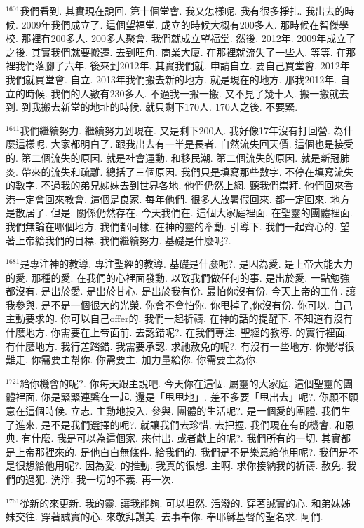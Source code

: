 \documentclass{book}
\begin{document}
$^{1601}$我們看到.
其實現在說回.
第十個堂會.
我又怎樣呢.
我有很多掙扎.
我出去的時候.
2009年我們成立了.
這個望福堂.
成立的時候大概有200多人.
那時候在智傑學校.
那裡有200多人.
200多人聚會.
我們就成立望福堂.
然後.
2012年.
2009年成立了之後.
其實我們就要搬遷.
去到旺角.
商業大廈.
在那裡就流失了一些人.
等等.
在那裡我們落腳了六年.
後來到2012年.
其實我們就.
申請自立.
要自己買堂會.
2012年我們就買堂會.
自立.
2013年我們搬去新的地方.
就是現在的地方.
那我2012年.
自立的時候.
我們的人數有230多人.
不過我一搬一搬.
又不見了幾十人.
搬一搬就去到.
到我搬去新堂的地址的時候.
就只剩下170人.
170人之後.
不要緊.

$^{1641}$我們繼續努力.
繼續努力到現在.
又是剩下200人.
我好像17年沒有打回營.
為什麼這樣呢.
大家都明白了.
跟我出去有一半是長者.
自然流失回天價.
這個也是接受的.
第二個流失的原因.
就是社會運動.
和移民潮.
第二個流失的原因.
就是新冠肺炎.
帶來的流失和疏離.
總括了三個原因.
我們只是填寫那些數字.
不停在填寫流失的數字.
不過我的弟兄姊妹去到世界各地.
他們仍然上網.
聽我們崇拜.
他們回來香港一定會回來教會.
這個是良家.
每年他們.
很多人放暑假回來.
都一定回來.
地方是散居了.
但是.
關係仍然存在.
今天我們在.
這個大家庭裡面.
在聖靈的團體裡面.
我們無論在哪個地方.
我們都同樣.
在神的靈的牽動.
引導下.
我們一起齊心的.
望著上帝給我們的目標.
我們繼續努力.
基礎是什麼呢?.

$^{1681}$是專注神的教導.
專注聖經的教導.
基礎是什麼呢?.
是因為愛.
是上帝大能大力的愛.
那種的愛.
在我們的心裡面發動.
以致我們做任何的事.
是出於愛.
一點勉強都沒有.
是出於愛.
是出於甘心.
是出於我有份.
最怕你沒有份.
今天上帝的工作.
讓我參與.
是不是一個很大的光榮.
你會不會怕你.
你甩掉了,你沒有份.
你可以.
自己主動要求的.
你可以自己offer的.
我們一起祈禱.
在神的話的提醒下.
不知道有沒有什麼地方.
你需要在上帝面前.
去認錯呢?.
在我們專注.
聖經的教導.
的實行裡面.
有什麼地方.
我行差踏錯.
我需要承認.
求祂赦免的呢?.
有沒有一些地方.
你覺得很難走.
你需要主幫你.
你需要主.
加力量給你.
你需要主為你.

$^{1721}$給你機會的呢?.
你每天跟主說吧.
今天你在這個.
屬靈的大家庭.
這個聖靈的團體裡面.
你是緊緊連繫在一起.
還是「甩甩地」.
差不多要「甩出去」呢?.
你願不願意在這個時候.
立志.
主動地投入.
參與.
團體的生活呢?.
是一個愛的團體.
我們生了進來.
是不是我們選擇的呢?.
就讓我們去珍惜.
去把握.
我們現在有的機會.
和恩典.
有什麼.
我是可以為這個家.
來付出.
或者獻上的呢?.
我們所有的一切.
其實都是上帝那裡來的.
是他白白無條件.
給我們的.
我們是不是樂意給他用呢?.
我們是不是很想給他用呢?.
因為愛.
的推動.
我真的很想.
主啊.
求你接納我的祈禱.
赦免.
我們的過犯.
洗淨.
我一切的不義.
再一次.

$^{1761}$從新的來更新.
我的靈.
讓我能夠.
可以坦然.
活潑的.
穿著誠實的心.
和弟妹姊妹交往.
穿著誠實的心.
來敬拜讚美.
去事奉你.
奉耶穌基督的聖名求.
阿們.
\newpage
\end{document}
